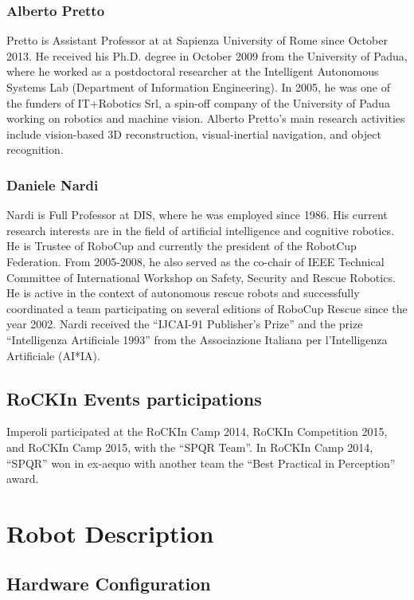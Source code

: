 \documentclass[conference]{IEEEtran}
\begin{document}
\subsubsection*{Alberto Pretto}
Pretto is Assistant Professor at at Sapienza University of Rome since October 2013. 
He received his Ph.D. degree in October 2009 from the University of Padua, where he worked as a postdoctoral researcher at the Intelligent Autonomous Systems Lab (Department of Information Engineering). 
In 2005, he was one of the funders of IT+Robotics Srl, a spin-off company of the University of Padua working on robotics and machine vision. 
Alberto Pretto's main research activities include vision-based 3D reconstruction, visual-inertial navigation, and object recognition.

\subsubsection*{Daniele Nardi}
Nardi is Full Professor at DIS, where he was employed since 1986. His current research interests are in the field of artificial intelligence and cognitive robotics. He is Trustee of RoboCup and currently the president of the RobotCup Federation.  From 2005-2008, he also served as the co-chair of IEEE Technical Committee of International Workshop on Safety, Security and Rescue Robotics.  He is active in the context of autonomous rescue robots and successfully coordinated a team participating on several editions of RoboCup Rescue since the year 2002.  
Nardi received the ``IJCAI-91 Publisher's Prize'' and the prize ``Intelligenza Artificiale 1993'' from the Associazione Italiana per l'Intelligenza Artificiale (AI*IA).

\subsection{RoCKIn Events participations}
Imperoli participated at the RoCKIn Camp 2014, RoCKIn Competition 2015, and RoCKIn Camp 2015, with the ``SPQR Team''. In RoCKIn Camp 2014, ``SPQR'' won in ex-aequo with another team the ``Best Practical in Perception'' award.

\section{Robot Description}

\subsection{Hardware Configuration}
\end{document}
